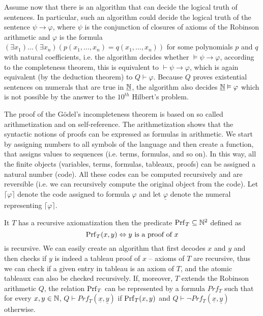 Assume now that there is an algorithm that can decide the logical truth of sentences. In particular, such an algorithm could decide the logical truth of the sentence $\psi \to \varphi$, where $\psi$ is the conjunction of closures of axioms of the Robinson arithmetic and $\varphi$ is the formula $(\exists x_1)\dots(\exists x_n)(p(x_1, \dots, x_n) = q(x_1, \dots, x_n))$ for some polynomials $p$ and $q$ with natural coefficients, i.e. the algorithm decides whether $\vDash \psi \to \varphi$, according to the completeness theorem, this is equivalent to $\vdash \psi \to \varphi$, which is again equivalent (by the deduction theorem) to $Q \vdash \varphi$. Because $Q$ proves existential sentences on numerals that are true in $\underline{\mathbb{N}}$, the algorithm also decides $\underline{\mathbb{N}} \vDash \varphi$ which is not possible by the answer to the $10^{th}$ Hilbert's problem.

The proof of the Gödel's incompleteness theorem is based on so called arithmetization and on self-reference. The arithmetization shows that the syntactic notions of proofs can be expressed as formulas in arithmetic. We start by assigning numbers to all symbols of the language and then create a function, that assigns values to sequences (i.e. terms, formulas, and so on). In this way, all the finite objects (variables, terms, formulas, tableaux, proofs) can be assigned a natural number (code). All these codes can be computed recursively and are reversible (i.e. we can recursively compute the original object from the code). Let $\lceil \varphi \rceil$ denote the code assigned to formula $\varphi$ and let $\underline{\varphi}$ denote the numeral representing $\lceil \varphi \rceil$.

It $T$ has a recursive axiomatization then the predicate $\operatorname{Prf}_T \subseteq \mathbb{N}^2$ defined as $$\operatorname{Prf}_T(x, y) \Leftrightarrow y \text{ is a proof of } x$$ is recursive. We can easily create an algorithm that first decodes $x$ and $y$ and then checks if $y$ is indeed a tableau proof of $x$ -- axioms of $T$ are recursive, thus we can check if a given entry in tableau is an axiom of $T$, and the atomic tableaux can also be checked recursively. If, moreover, $T$ extends the Robinson arithmetic $Q$, the relation $\operatorname{Prf}_T$ can be represented by a formula $Prf_T$ such that for every $x, y \in \mathbb{N}$, $Q \vdash Prf_T(\underline{x}, \underline{y})$ if $\operatorname{Prf}_T(x,y)$ and $Q \vdash \neg Prf_T(\underline{x}, \underline{y})$ otherwise.

